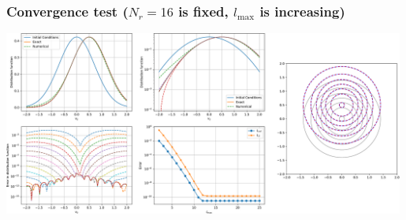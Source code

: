 \documentclass[mathserif, aspectratio=169]{beamer}
\newcommand{\vect}[1]{\boldsymbol{#1}}
\newcommand{\of}[1]{\mleft( #1 \mright)}
\begin{document}
\begin{frame}
\frametitle{\small Convergence test ($N_r = 16$ is fixed, $l_{\max}$ is increasing)}
\begin{center}
\includegraphics[width=0.99\textwidth]{figures/advection_operator_changing_lmax}
\end{center}
\end{frame}

\end{document}
